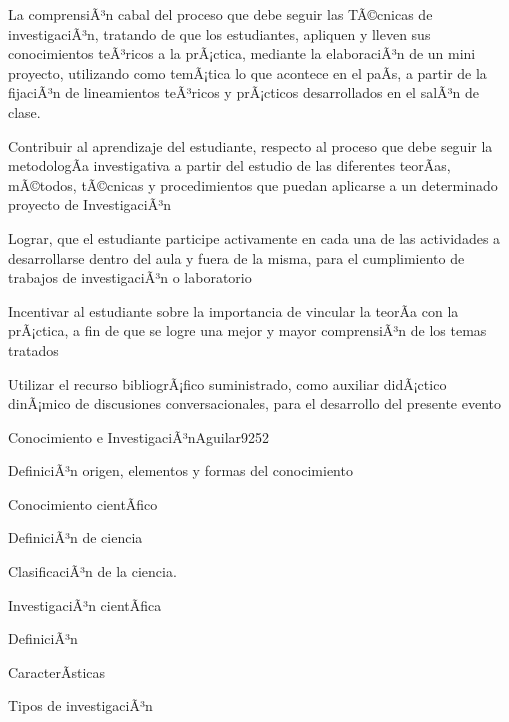 \begin{syllabus}


\begin{justification}
La comprensiÃ³n cabal del proceso que debe seguir las TÃ©cnicas de
investigaciÃ³n,  tratando de que los estudiantes, apliquen y lleven 
sus conocimientos teÃ³ricos a la  prÃ¡ctica, mediante la elaboraciÃ³n 
de un mini proyecto,  utilizando como temÃ¡tica  lo que acontece en 
el paÃ­s,  a partir de la fijaciÃ³n de lineamientos  teÃ³ricos y 
prÃ¡cticos desarrollados en el salÃ³n de clase.
\end{justification}

\begin{goals}
\item Contribuir al aprendizaje del estudiante, respecto al proceso que debe seguir la metodologÃ­a investigativa a partir del estudio de las diferentes teorÃ­as, mÃ©todos, tÃ©cnicas y procedimientos que puedan aplicarse a un determinado proyecto de InvestigaciÃ³n 
\item Lograr, que el estudiante participe activamente  en cada una de las actividades a desarrollarse dentro del aula  y fuera de la misma, para el cumplimiento de trabajos de investigaciÃ³n o laboratorio
\item Incentivar al estudiante sobre la  importancia de vincular la teorÃ­a con la prÃ¡ctica, a fin de que se logre una mejor y mayor comprensiÃ³n de los temas tratados
\item Utilizar el recurso bibliogrÃ¡fico suministrado, como auxiliar didÃ¡ctico dinÃ¡mico de discusiones conversacionales,  para el desarrollo del presente evento
\end{goals}

\begin{outcomes}
\end{outcomes}

\begin{unit}{Conocimiento e InvestigaciÃ³n}{Aguilar92}{5}{2}
   \begin{topics}
      \item DefiniciÃ³n origen, elementos y formas del conocimiento
	\item Conocimiento cientÃ­fico
	\item DefiniciÃ³n de ciencia
	\item ClasificaciÃ³n de la ciencia.
	\item InvestigaciÃ³n cientÃ­fica
	\item DefiniciÃ³n
	\item CaracterÃ­sticas
	\item Tipos de investigaciÃ³n
   \end{topics}


\end{unit}
\end{syllabus}
